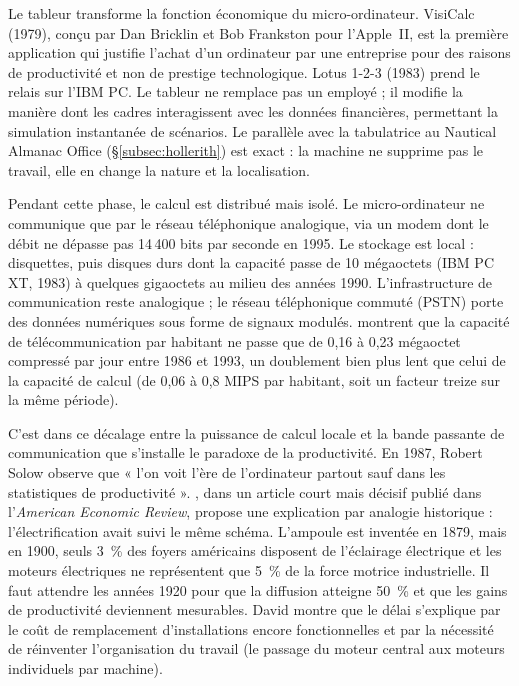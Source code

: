 Le tableur transforme la fonction économique du micro-ordinateur. VisiCalc (1979), conçu par Dan Bricklin et Bob Frankston pour l'Apple~II, est la première application qui justifie l'achat d'un ordinateur par une entreprise pour des raisons de productivité et non de prestige technologique. Lotus 1-2-3 (1983) prend le relais sur l'IBM PC. Le tableur ne remplace pas un employé ; il modifie la manière dont les cadres interagissent avec les données financières, permettant la simulation instantanée de scénarios. Le parallèle avec la tabulatrice au Nautical Almanac Office (§\ref{subsec:hollerith}) est exact : la machine ne supprime pas le travail, elle en change la nature et la localisation.
 
Pendant cette phase, le calcul est distribué mais isolé. Le micro-ordinateur ne communique que par le réseau téléphonique analogique, via un modem dont le débit ne dépasse pas 14\,400 bits par seconde en 1995. Le stockage est local : disquettes, puis disques durs dont la capacité passe de 10 mégaoctets (IBM PC XT, 1983) à quelques gigaoctets au milieu des années 1990. L'infrastructure de communication reste analogique ; le réseau téléphonique commuté (PSTN) porte des données numériques sous forme de signaux modulés. \textcite{hilbert_worlds_2011} montrent que la capacité de télécommunication par habitant ne passe que de 0,16 à 0,23 mégaoctet compressé par jour entre 1986 et 1993, un doublement bien plus lent que celui de la capacité de calcul (de 0,06 à 0,8 MIPS par habitant, soit un facteur treize sur la même période).
 
C'est dans ce décalage entre la puissance de calcul locale et la bande passante de communication que s'installe le paradoxe de la productivité. En 1987, Robert Solow observe que « l'on voit l'ère de l'ordinateur partout sauf dans les statistiques de productivité ». \textcite{david_dynamo_1990}, dans un article court mais décisif publié dans l'\emph{American Economic Review}, propose une explication par analogie historique : l'électrification avait suivi le même schéma. L'ampoule est inventée en 1879, mais en 1900, seuls 3~\% des foyers américains disposent de l'éclairage électrique et les moteurs électriques ne représentent que 5~\% de la force motrice industrielle. Il faut attendre les années 1920 pour que la diffusion atteigne 50~\% et que les gains de productivité deviennent mesurables. David montre que le délai s'explique par le coût de remplacement d'installations encore fonctionnelles et par la nécessité de réinventer l'organisation du travail (le passage du moteur central aux moteurs individuels par machine).
 

